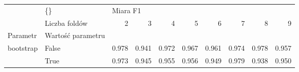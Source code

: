 \begin{tabular}{llrrrrrrrr}
\hline
          & \{\} & \multicolumn{8}{l}{Miara F1} \\
          & Liczba foldów &        2 &      3 &      4 &      5 &      6 &      7 &      8 &      9 \\
Parametr & Wartość parametru &          &        &        &        &        &        &        &        \\
\hline
bootstrap & False &    0.978 &  0.941 &  0.972 &  0.967 &  0.961 &  0.974 &  0.978 &  0.957 \\
          & True &    0.973 &  0.945 &  0.955 &  0.956 &  0.949 &  0.979 &  0.938 &  0.950 \\
\hline
\end{tabular}
